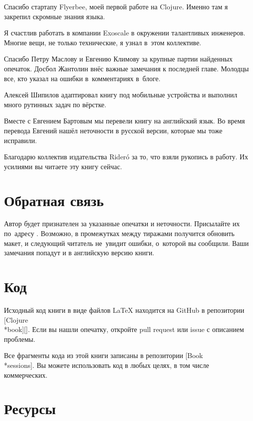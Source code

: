 Спасибо стартапу Flyerbee, моей первой работе на Clojure. Именно там я закрепил
скромные знания языка.

Я счастлив работать в компании Exoscale в окружении талантливых
инженеров. Многие вещи, не только технические, я узнал в~этом коллективе.

Спасибо Петру Маслову и Евгению Климову за крупные партии найденных
опечаток. Досбол Жантолин внёс важные замечания к последней главе. Молодцы все,
кто указал на ошибки в~комментариях в~блоге.

Алексей Шипилов адаптировал книгу под мобильные устройства и выполнил много
рутинных задач по вёрстке.

Вместе с Евгением Бартовым мы перевели книгу на английский язык. Во время
перевода Евгений нашёл неточности в русской версии, которые мы тоже исправили.

\ifridero
Благодарю коллектив издательства Rider\'{o} за то, что взяли рукопись в
работу. Их усилиями вы читаете эту книгу сейчас.
\fi

\section*{Обратная связь}

Автор будет признателен за указанные опечатки и неточности. Присылайте их
по~адресу \EMAILLINK. Возможно, в промежутках между тиражами получится обновить
макет, и следующий читатель не~увидит ошибки, о~которой вы сообщили. Ваши
замечания попадут и в английскую версию книги.

\section*{Код}

\iflarge
\setlength{\marginparoffset}{-10mm}
\fi

Исходный код книги в виде файлов \LaTeX{} находится на GitHub в репозитории
[Clojure\\*book][\marginparoffset]. Если
вы нашли опечатку, откройте pull request или issue с описанием проблемы.

Все фрагменты кода из этой книги записаны в репозитории
[Book\\*sessions]. Вы
можете использовать код в любых целях, в том числе коммерческих.

\section*{Ресурсы}

